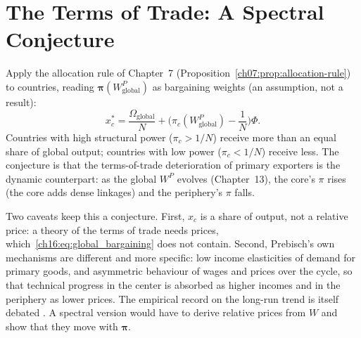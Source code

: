 \documentclass[../structural_economics_book.tex]{subfiles}
\begin{document}
\section{The Terms of Trade: A Spectral Conjecture}
\label{ch16:sec:terms}

\begin{conjecture}\label{ch16:thm:prebisch_singer}
Apply the allocation rule of Chapter~7 (Proposition~\ref{ch07:prop:allocation-rule}) to countries, reading $\boldsymbol{\pi}(W^P_{\text{global}})$ as bargaining weights (an assumption, not a result):
\begin{equation}\label{ch16:eq:global_bargaining}
x_c^* = \frac{\Omega_{\text{global}}}{N} + \Big(\pi_c(W^P_{\text{global}}) - \frac{1}{N}\Big)\Phi.
\end{equation}
Countries with high structural power ($\pi_c > 1/N$) receive more than an equal share of global output; countries with low power ($\pi_c < 1/N$) receive less. The conjecture is that the terms-of-trade deterioration of primary exporters is the dynamic counterpart: as the global $W^P$ evolves (Chapter~13), the core's $\pi$ rises (the core adds dense linkages) and the periphery's $\pi$ falls.
\end{conjecture}

Two caveats keep this a conjecture. First, $x_c$ is a share of output, not a relative price: a theory of the terms of trade needs prices, which~\eqref{ch16:eq:global_bargaining} does not contain. Second, Prebisch's own mechanisms are different and more specific: low income elasticities of demand for primary goods, and asymmetric behaviour of wages and prices over the cycle, so that technical progress in the center is absorbed as higher incomes and in the periphery as lower prices. The empirical record on the long-run trend is itself debated \citep{grilli1988primary,harvey2010prebisch,arezki2014testing}. A spectral version would have to derive relative prices from $W$ and show that they move with $\boldsymbol{\pi}$.
\end{document}
